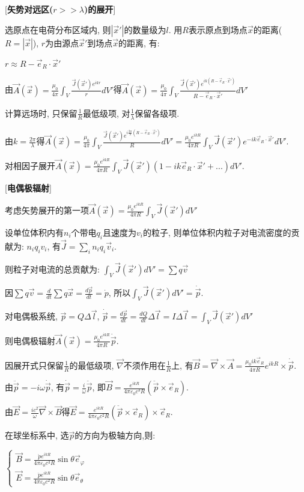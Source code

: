 [\textbf{矢势对远区($r>>\lambda$)的展开}]\par
\qquad 选原点在电荷分布区域内, 则$|\vec x'|$的数量级为$l$. 用$R$表示原点到场点$\vec x$的距离($R=|\vec x|$), $r$为由源点$\vec x'$到场点$\vec x$的距离, 有:\par
\qquad \qquad $r\approx R-\vec e_R\cdot\vec x'$\par
\qquad 由$\vec A(\vec x)=\frac{\mu_0}{4\pi}\int_V\frac{\vec J(\vec x')e^{ikr}}{r}dV'$得$\vec A(\vec x)=\frac{\mu_0}{4\pi}\int_V\frac{\vec J(\vec x')e^{ik(R-\vec e_R\cdot\vec x')}}{R-\vec e_R\cdot\vec x'}dV'$\par
\qquad 计算远场时, 只保留$\frac{1}{R}$最低级项, 对$\frac{1}{\lambda}$保留各级项.\par
\qquad 由$k=\frac{2\pi}{\lambda}$得$\vec A(\vec x)=\frac{\mu_0}{4\pi}\int_V\frac{\vec J(\vec x')e^{i\frac{2\pi}{\lambda}(R-\vec e_R\cdot\vec x')}}{R}dV'=\frac{\mu_0e^{ikR}}{4\pi R}\int_V\vec J(\vec x')e^{-ik\vec e_R\cdot\vec x'}dV'$.\par
\qquad 对相因子展开$\vec A(\vec x)=\frac{\mu_0e^{ikR}}{4\pi R}\int_V\vec J(\vec x')(1-ik\vec e_R\cdot\vec x'+...)dV'$.\par

\clearpage

[\textbf{电偶极辐射}] \par
\qquad 考虑矢势展开的第一项$\vec A(\vec x)=\frac{\mu_0e^{ikR}}{4\pi R}\int_V\vec J(\vec x')dV'$\par
\qquad 设单位体积内有$n_i$个带电$q_i$且速度为$v_i$的粒子, 则单位体积内粒子对电流密度的贡献为: $n_iq_iv_i$, 有$\vec J=\sum\limits_i n_iq_i\vec v_i$.\par
\qquad \qquad 则粒子对电流的总贡献为: $\int_V\vec J(\vec x')dV'=\sum q\vec v$\par
\qquad 因$\sum q\vec v=\frac{d}{dt}\sum q\vec x=\frac{d\vec p}{dt}=\dot p$, 所以$\int_V\vec J(\vec x')dV'=\dot{\vec p}$.\par
\qquad 对电偶极系统, $\vec p=Q\Delta\vec l$, $\dot{\vec p}=\frac{d\vec p}{dt}=\frac{dQ}{dt}\Delta\vec l=I\Delta\vec l=\int_V\vec J(\vec x')dV'$\par
\qquad \qquad 则电偶极辐射$\vec A(\vec x)=\frac{\mu_0e^{ikR}}{4\pi R}\dot{\vec p}$.\par
\qquad 因展开式只保留$\frac{1}{R}$的最低级项, $\vec\nabla$不须作用在$\frac{1}{R}$上, 有$\vec B=\vec\nabla\times\vec A=\frac{\mu_0ik\vec e_R}{4\pi R}e^{ikR}\times\dot{\vec p}$.\par
\qquad 由$\ddot{\vec p}=-i\omega\dot{\vec p}$, 有$\dot{\vec p}=\frac{i}{\omega}\ddot{\vec p}$, 即$\vec B=\frac{e^{ikR}}{4\pi\varepsilon_0c^3R}\left(\ddot{\vec p}\times\vec e_R\right)$.\par
\qquad 由$\vec E=\frac{ic^2}{\omega}\vec\nabla\times\vec B$得$\vec E=\frac{e^{ikR}}{4\pi\varepsilon_0c^2R}\left(\ddot{\vec p}\times\vec e_R\right)\times\vec e_R$.\par
\qquad 在球坐标系中, 选$\vec p$的方向为极轴方向,则:\par
\qquad \qquad $\begin{cases}\vec B=\frac{\ddot pe^{ikR}}{4\pi\varepsilon_0c^3R}\sin\theta\vec e_\varphi\\\vec E=\frac{\ddot pe^{ikR}}{4\pi\varepsilon_0c^2R}\sin\theta\vec e_\theta\end{cases}$

